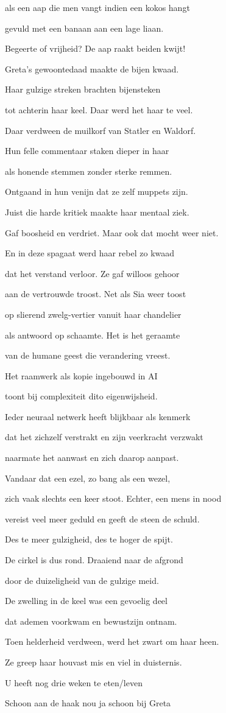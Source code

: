 als een aap die men vangt
indien een kokos hangt

gevuld met een banaan
aan een lage liaan.

Begeerte of vrijheid?
De aap raakt beiden kwijt!

Greta’s gewoontedaad
maakte de bijen kwaad.

Haar gulzige streken
brachten bijensteken

tot achterin haar keel.
Daar werd het haar te veel.

Daar verdween de muilkorf
van Statler en Waldorf.

Hun felle commentaar
staken dieper in haar

als honende stemmen
zonder sterke remmen.

Ontgaand in hun venijn
dat ze zelf muppets zijn.

Juist die harde kritiek
maakte haar mentaal ziek.

Gaf boosheid en verdriet.
Maar ook dat mocht weer niet.

En in deze spagaat
werd haar rebel zo kwaad

dat het verstand verloor.
Ze gaf willoos gehoor

aan de vertrouwde troost.
Net als Sia weer toost

op slierend zwelg-vertier
vanuit haar chandelier

als antwoord op schaamte.
Het is het geraamte

van de humane geest
die verandering vreest.

Het raamwerk als kopie
ingebouwd in AI

toont bij complexiteit
dito eigenwijsheid.

Ieder neuraal netwerk
heeft blijkbaar als kenmerk

dat het zichzelf verstrakt
en zijn veerkracht verzwakt

naarmate het aanwast
en zich daarop aanpast.

Vandaar dat een ezel,
zo bang als een wezel,

zich vaak slechts een keer stoot.
Echter, een mens in nood

vereist veel meer geduld
en geeft de steen de schuld.

Des te meer gulzigheid,
des te hoger de spijt.

De cirkel is dus rond.
Draaiend naar de afgrond

door de duizeligheid
van de gulzige meid.

De zwelling in de keel
was een gevoelig deel

dat ademen voorkwam
en bewustzijn ontnam.

Toen helderheid verdween,
werd het zwart om haar heen.

Ze greep haar houvast mis
en viel in duisternis.

U heeft nog drie weken te eten/leven

Schoon aan de haak nou ja schoon bij Greta
